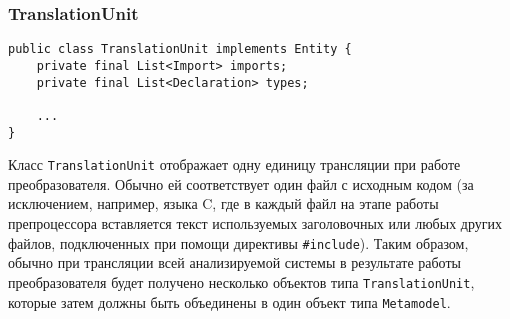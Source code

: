 \subsubsection{TranslationUnit}

\begin{lstlisting}
public class TranslationUnit implements Entity {
    private final List<Import> imports;
    private final List<Declaration> types;

    ...
}
\end{lstlisting}

Класс \texttt{TranslationUnit} отображает одну единицу трансляции при работе
преобразователя. Обычно ей соответствует один файл с исходным кодом (за
исключением, например, языка C, где в каждый файл на этапе работы препроцессора
вставляется текст используемых заголовочных или любых других файлов,
подключенных при помощи директивы \texttt{\#include}). Таким образом, обычно при
трансляции всей анализируемой системы в результате работы преобразователя
будет получено несколько объектов типа \texttt{TranslationUnit}, которые затем
должны быть объединены в один объект типа \texttt{Metamodel}.

